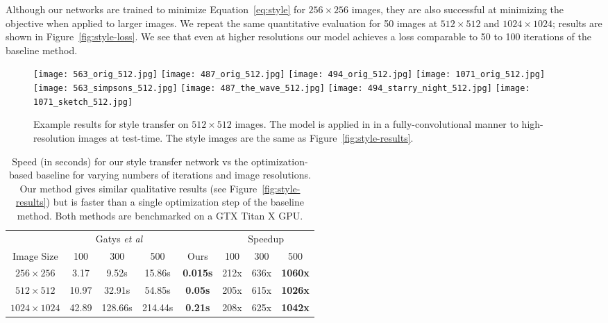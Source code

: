 \documentclass[runningheads]{llncs}
\newcommand{\etal}{\textit{et al}}
\begin{document}
Although our networks are trained to minimize Equation~\ref{eq:style} for $256\times256$ images,
they are also successful at minimizing the objective when applied to larger images. We repeat the
same quantitative evaluation for 50 images at $512\times512$ and $1024\times1024$; results are shown
in Figure~\ref{fig:style-loss}. We see that even at higher resolutions our model achieves a loss
comparable to 50 to 100 iterations of the baseline method.

\begin{figure}[t]
  \centering
  \texttt{[image: 563\_orig\_512.jpg]} 
  \texttt{[image: 487\_orig\_512.jpg]}
  \texttt{[image: 494\_orig\_512.jpg]}
  \texttt{[image: 1071\_orig\_512.jpg]} \\
  \texttt{[image: 563\_simpsons\_512.jpg]}
  \texttt{[image: 487\_the\_wave\_512.jpg]}
  \texttt{[image: 494\_starry\_night\_512.jpg]}
  \texttt{[image: 1071\_sketch\_512.jpg]}
  \vspace{-3mm}
  \caption{Example results for style transfer on $512\times512$ images. The model
    is applied in in a fully-convolutional manner to high-resolution images at test-time.
    The style images are the same as Figure~\ref{fig:style-results}.
  }
  \label{fig:style-results-512}
\end{figure}

\begin{table}[t]
  \centering
  \begin{tabular}{c||ccc|c||ccc}
    & \multicolumn{3}{c|}{Gatys \etal~\cite{gatys2015neural}} & 
    & \multicolumn{3}{c}{Speedup}\\
    Image Size & 100 & 300 & 500 \hspace{1mm} &
    \hspace{1mm} Ours \hspace{1mm} & \hspace{1mm} 100 & 300 & 500 \\
    \hline
    $256 \times 256$ & 3.17 & 9.52s & 15.86s &
    \textbf{0.015s} & 212x & 636x & \textbf{1060x} \\
    $512 \times 512$ & 10.97 & 32.91s & 54.85s &
    \textbf{0.05s} & 205x & 615x & \textbf{1026x} \\
    $1024 \times 1024$ & 42.89 & 128.66s & 214.44s &
    \textbf{0.21s} & 208x & 625x & \textbf{1042x}\\
  \end{tabular}
  \vspace{1mm}
  \caption{Speed (in seconds) for our style transfer network vs the optimization-based
    baseline for varying numbers of iterations and image resolutions.
    Our method gives similar qualitative results (see Figure~\ref{fig:style-results})
    but is faster than a single optimization step of the baseline method. Both methods
    are benchmarked on a GTX Titan X GPU.
  }
  \label{tab:style-speed}
  \vspace{-8mm}
\end{table}
\end{document}
